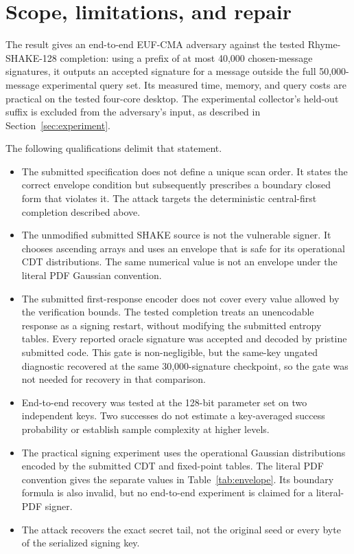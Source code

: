 \documentclass[11pt,a4paper]{article}
\begin{document}
\section{Scope, limitations, and repair}
\label{sec:scope}

The result gives an end-to-end EUF-CMA adversary against the tested
Rhyme-SHAKE-128 completion: using a prefix of at most 40,000 chosen-message
signatures, it outputs an accepted signature for a message outside the full
50,000-message experimental query set.  Its measured time, memory, and query
costs are practical on the tested four-core desktop.  The experimental
collector's held-out suffix is excluded from the adversary's input, as
described in Section~\ref{sec:experiment}.

The following qualifications delimit that statement.
\begin{itemize}[leftmargin=1.5em]
  \item The submitted specification does not define a unique scan order.
        It states the correct envelope condition but subsequently prescribes
        a boundary closed form that violates it.  The attack targets the
        deterministic central-first completion described above.
  \item The unmodified submitted SHAKE source is not the vulnerable signer.
        It chooses ascending arrays and uses an envelope that is safe for its
        operational CDT distributions.  The same numerical value is not an
        envelope under the literal PDF Gaussian convention.
  \item The submitted first-response encoder does not cover every value
        allowed by the verification bounds.  The tested completion treats an
        unencodable response as a signing restart, without modifying the
        submitted entropy tables.  Every reported oracle signature was
        accepted and decoded by pristine submitted code.  This gate is
        non-negligible, but the same-key ungated diagnostic recovered at the
        same 30,000-signature checkpoint, so the gate was not needed for
        recovery in that comparison.
  \item End-to-end recovery was tested at the 128-bit parameter set on two
        independent keys.  Two successes do not estimate a key-averaged
        success probability or establish sample complexity at higher levels.
  \item The practical signing experiment uses the operational Gaussian
        distributions encoded by the submitted CDT and fixed-point tables.
        The literal PDF convention gives the separate values in
        Table~\ref{tab:envelope}.  Its boundary formula is also invalid, but
        no end-to-end experiment is claimed for a literal-PDF signer.
  \item The attack recovers the exact secret tail, not the original seed or
        every byte of the serialized signing key.
\end{itemize}
\end{document}
